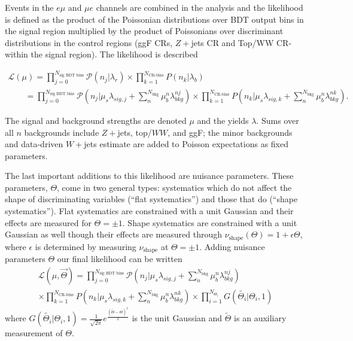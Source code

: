 Events in the $e\mu$ and $\mu e$ channels are combined in the analysis and the likelihood is defined as the product of the Poissonian distributions over BDT output bins in the signal region multiplied by the product of Poissonians over discriminant distributions in the control regions (ggF CRs, $Z+$jets CR and Top/WW CR- within the signal region). The likelihood is described 

\begin{equation}
  \begin{aligned}
\mathcal{L}(\mu) = \displaystyle\prod_{j=0}^{N_{\text{sig BDT bins}}} \mathcal{P} (n_{j}|\lambda_r) \times \displaystyle\prod_{k=1}^{N_{\text{CR-bins}}} P(n_{k}|\lambda_b) \\
\qquad = \displaystyle\prod_{j=0}^{N_{\text{sig BDT bins}}} \mathcal{P} (n_{j}|\mu_s \lambda_{sig,j} + \displaystyle\sum_{n}^{N_{\text{bkg}}}\mu_b^{n} \lambda_{bkg}^{nj}) \times \displaystyle\prod_{k=1}^{N_{\text{CR-bins}}} P(n_{k}|\mu_s \lambda_{sig,k} + \displaystyle\sum_{n}^{N_{\text{bkg}}}\mu_b^{n} \lambda_{bkg}^{nk}).
  \end{aligned}
\end{equation}

The signal and background strengths are denoted $\mu$ and the yields $\lambda$. Sums over all $n$ backgrounds include $Z+$jets, top/$WW$, and ggF; the minor backgrounds and data-driven $W+$jets estimate are added to Poisson expectations as fixed parameters. 

The last important additions to this likelihood are nuisance parameters. These parameters, $\Theta$, come in two general types: systematics which do not affect the shape of discriminating variables (``flat systematics'') and those that do (``shape systematics''). Flat systematics are constrained with a unit Gaussian and their effects are measured for $\Theta=\pm1$. Shape systematics are constrained with a unit Gaussian as well though their effects are measured through $\nu_{\text{shape}}(\Theta)= 1+\epsilon\Theta$, where $\epsilon$ is determined by measuring $\nu_{\text{shape}}$ at $\Theta=\pm 1$. Adding nuisance parameters $\Theta$ our final likelihood can be written 
\begin{equation}
  \begin{aligned}
\mathcal{L}(\mu,\vec{\Theta}) = \displaystyle\prod_{j=0}^{N_{\text{sig BDT bins}}} \mathcal{P} (n_{j}|\mu_s \lambda_{sig,j} + \displaystyle\sum_{n}^{N_{\text{bkg}}}\mu_b^{n} \lambda_{bkg}^{nj}) \\
\times \displaystyle\prod_{k=1}^{N_{\text{CR-bins}}} P(n_{k}|\mu_s \lambda_{sig,k} + \displaystyle\sum_{n}^{N_{\text{bkg}}}\mu_b^{n} \lambda_{bkg}^{nk}) \times \displaystyle\prod_{i=1}^{N_{\Theta_i}}G(\tilde{\Theta_i}|\Theta_i,1)
  \end{aligned}
\end{equation}
where $G(\tilde{\Theta_i}|\Theta_i,1) = \frac{1}{\sqrt{2\pi}}e^{\frac{(\tilde{\Theta}-\Theta)^2}{2}}$ is the unit Gaussian and $\tilde{\Theta}$ is an auxiliary measurement of $\Theta$.

